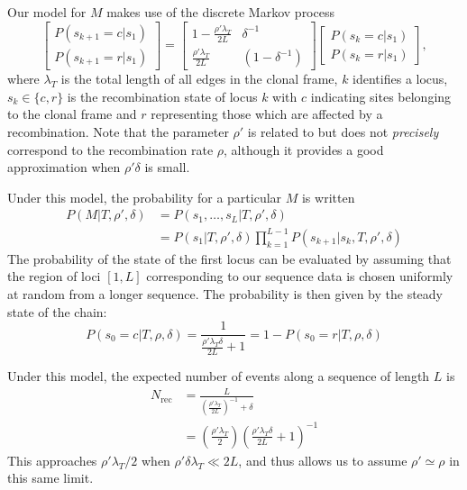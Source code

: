 \documentclass[a4paper,10pt]{article}
\begin{document}
Our model for $M$ makes use of the discrete Markov process
\begin{equation}
\begin{bmatrix}
P(s_{k+1}=c|s_1) \\
P(s_{k+1}=r|s_1)
\end{bmatrix}
=
\begin{bmatrix}
1-\frac{\rho' \lambda_T}{2L} & \delta^{-1} \\
\frac{\rho' \lambda_T}{2L} & (1-\delta^{-1})
\end{bmatrix}
\begin{bmatrix}
P(s_{k}=c|s_1) \\
P(s_{k}=r|s_1)
\end{bmatrix},
\end{equation}
where $\lambda_T$ is the total length of all edges in the clonal
frame, $k$ identifies a locus, $s_k\in\{c,r\}$ is the recombination
state of locus $k$ with $c$ indicating sites belonging to the clonal
frame and $r$ representing those which are affected by a
recombination.  Note that the parameter $\rho'$ is related to but does
not \emph{precisely} correspond to the recombination rate $\rho$,
although it provides a good approximation when $\rho'\delta$ is small.

Under this model, the probability for a particular $M$ is written
\begin{align}
  P(M|T,\rho',\delta)&=P(s_1,\ldots,s_L|T,\rho',\delta)\nonumber\\
  &=P(s_1|T,\rho',\delta)\prod_{k=1}^{L-1}P(s_{k+1}|s_k,T,\rho',\delta)
\end{align}
The probability of the state of the first locus can be evaluated by
assuming that the region of loci $[1,L]$ corresponding to our sequence
data is chosen uniformly at random from a longer sequence.  The
probability is then given by the steady state of the chain:
\begin{equation}
P(s_0=c|T,\rho,\delta)=\frac{1}{\frac{\rho'\lambda_T\delta}{2L}+1}=1-P(s_0=r|T,\rho,\delta)
\end{equation}

Under this model, the expected number of events along a sequence of
length $L$ is
\begin{align}
N_{\mathrm{rec}}&=\frac{L}{\left(\frac{\rho'\lambda_T}{2L}\right)^{-1}
  + \delta}\nonumber\\
&=\left(\frac{\rho'\lambda_T}{2}\right)\left(\frac{\rho'\lambda_T\delta}{2L}
  + 1\right)^{-1}
\end{align}
This approaches $\rho'\lambda_T/2$ when $\rho'\delta\lambda_T\ll 2L$,
and thus allows us to assume $\rho'\simeq\rho$ in this same limit.
\end{document}
